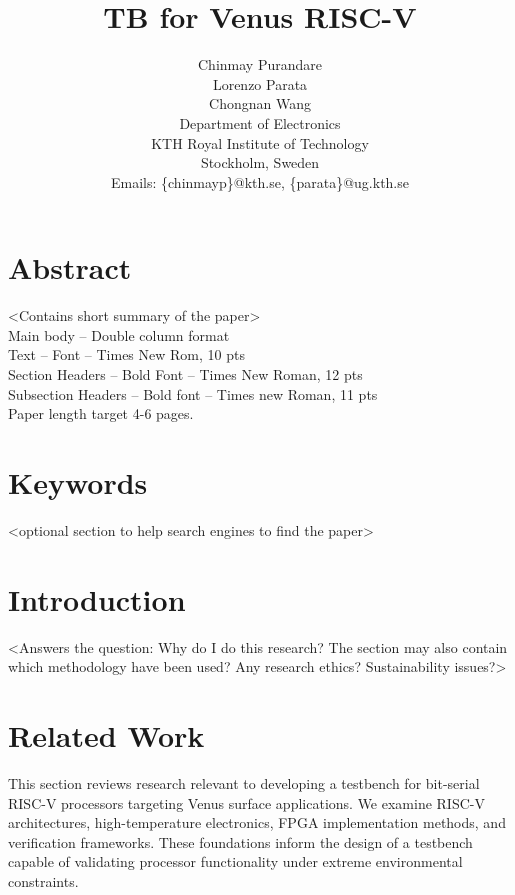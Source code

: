 \documentclass[10pt,twocolumn]{article}
\title{\textbf{TB for Venus RISC-V}\\[0.5em]}
\author{Chinmay Purandare\\
Lorenzo Parata\\
Chongnan Wang\\
Department of Electronics\\
KTH Royal Institute of Technology\\
Stockholm, Sweden\\
Emails: \{chinmayp\}@kth.se, \{parata\}@ug.kth.se}
\date{}
\begin{document}
\maketitle

\section*{Abstract}
<Contains short summary of the paper>\\
Main body – Double column format\\
Text – Font – Times New Rom, 10 pts\\
Section Headers – Bold Font – Times New Roman, 12 pts\\
Subsection Headers – Bold font – Times new Roman, 11 pts\\
Paper length target 4-6 pages.

\section*{Keywords}
<optional section to help search engines to find the paper>

\section{Introduction}
<Answers the question: Why do I do this research? The section may also contain which methodology have been used? Any research ethics? Sustainability issues?>

\section{Related Work}
This section reviews research relevant to developing a testbench for bit-serial RISC-V processors targeting Venus surface applications. We examine RISC-V architectures, high-temperature electronics, FPGA implementation methods, and verification frameworks. These foundations inform the design of a testbench capable of validating processor functionality under extreme environmental constraints.
\end{document}
